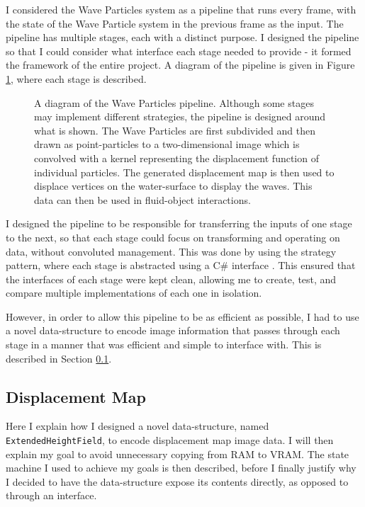 \documentclass[12pt,a4paper,twoside]{report}
\begin{document}
I considered the Wave Particles system as a pipeline that runs every frame,
with the state of the Wave Particle system in the previous frame as the input.
The pipeline has multiple stages, each with a distinct purpose. I designed the
pipeline so that I could consider what interface each stage needed to provide -
it formed the framework of the entire project. A diagram of the pipeline is
given in Figure \ref{fig:pipeline}, where each stage is described.

\begin{figure}[h]
\centering
\def\svgwidth{\linewidth}

\caption{A diagram of the Wave Particles pipeline. Although some stages may
implement different strategies, the pipeline is designed around what is shown.
The Wave Particles are first subdivided and then drawn as point-particles to a
two-dimensional image which is convolved with a kernel representing the
displacement function of individual particles. The generated displacement map
is then used to displace vertices on the water-surface to display the waves.
This data can then be used in fluid-object interactions.}
\label{fig:pipeline}
\end{figure}

I designed the pipeline to be responsible for transferring the inputs of one
stage to the next, so that each stage could focus on transforming and operating
on data, without convoluted management. This was done by using the strategy
pattern, where each stage is abstracted using a C\# interface
\cite{StrategyPattern}. This ensured that the interfaces of each stage were kept
clean, allowing me to create, test, and compare multiple implementations of
each one in isolation.

However, in order to allow this pipeline to be as efficient as possible, I had
to use a novel data-structure to encode image information that passes through
each stage in a manner that was efficient and simple to interface with. This is
described in Section \ref{sec:extended_height_field}.

\subsection{Displacement Map}
\label{sec:extended_height_field}

Here I explain how I designed a novel data-structure, named
\texttt{ExtendedHeightField}, to encode displacement map image data. I will
then explain my goal to avoid unnecessary copying from RAM to VRAM. The
state machine I used to achieve my goals is then described, before I finally
justify why I decided to have the data-structure expose its contents directly,
as opposed to through an interface.
\end{document}
